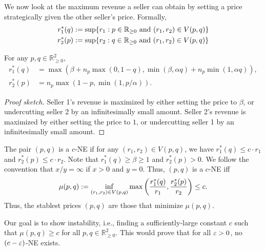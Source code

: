 We now look at the maximum revenue a seller can obtain by setting a price strategically
given the other seller's price. Formally,
\begin{align*}
r_1^*(q) &:= \sup\{r_1: p \in \mathbb{R}_{\ge 0} \text{ and } (r_1, r_2) \in V(p, q)\}
\\ r_2^*(p) &:= \sup\{r_2: q \in \mathbb{R}_{\ge 0} \text{ and } (r_1, r_2) \in V(p, q)\}
\end{align*}

\begin{lemma}
\label{thm:rstar}
For any $p, q \in \mathbb{R}_{\ge 0}^2$,
\begin{align*}
r_1^*(q) &= \max\left(
    \beta + n_p\max(0, 1-q),
    \min(\beta, \alpha q) + n_p\min(1, \alpha q)
    \right),
\\ r_2^*(p) &= n_p\max(1-p, \min(1, p/\alpha)).
\end{align*}
\end{lemma}
\begin{proof}[Proof sketch]
Seller 1's revenue is maximized by either setting the price to $\beta$,
or undercutting seller 2 by an infinitesimally small amount.
Seller 2's revenue is maximized by either setting the price to $1$,
or undercutting seller 1 by an infinitesimally small amount.
\end{proof}

The pair $(p, q)$ is a $c$-NE if for any $(r_1, r_2) \in V(p, q)$, we have
$r^*_1(q) \le c \cdot r_1$ and $r^*_2(p) \le c \cdot r_2$.
Note that $r^*_1(q) \ge \beta \ge 1$ and $r^*_2(p) > 0$.
We follow the convention that $x/y = \infty$ if $x > 0$ and $y = 0$.
Thus, $(p, q)$ is a $c$-NE iff
\[ \mu(p, q) := \inf_{(r_1, r_2) \in V(p, q)} \max\left(\frac{r_1^*(q)}{r_1}, \frac{r_2^*(p)}{r_2}\right) \le c. \]
Thus, the stablest prices $(p, q)$ are those that minimize $\mu(p, q)$.

Our goal is to show instability, i.e., finding a sufficiently-large constant $c$
such that $\mu(p, q) \ge c$ for all $p, q \in \mathbb{R}_{\ge 0}^2$.
This would prove that for all $\varepsilon > 0$, no $(c-\varepsilon)$-NE exists.
